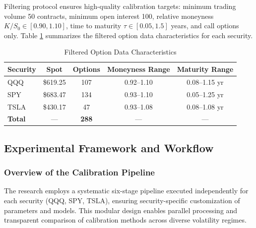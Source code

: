 \documentclass[12pt,a4paper]{article}
\begin{document}
Filtering protocol ensures high-quality calibration targets: minimum trading volume 50 contracts, minimum open interest 100, relative moneyness $K/S_0 \in [0.90, 1.10]$, time to maturity $\tau \in [0.05, 1.5]$ years, and call options only. Table \ref{tab:data_char} summarizes the filtered option data characteristics for each security.

\begin{table}[H]

\centering

\caption{Filtered Option Data Characteristics}

\label{tab:data_char}

\begin{tabular}{lcccc}

\toprule

\textbf{Security} & \textbf{Spot} & \textbf{Options} & \textbf{Moneyness Range} & \textbf{Maturity Range} \\

\midrule

QQQ & \$619.25 & 107 & 0.92--1.10 & 0.08--1.15 yr \\

SPY & \$683.47 & 134 & 0.93--1.10 & 0.05--1.25 yr \\

TSLA & \$430.17 & 47 & 0.93--1.08 & 0.08--1.08 yr \\

\midrule

\textbf{Total} & --- & \textbf{288} & --- & --- \\

\bottomrule

\end{tabular}

\end{table}

\subsection{Experimental Framework and Workflow}

\subsubsection{Overview of the Calibration Pipeline}

The research employs a systematic six-stage pipeline executed independently for each security (QQQ, SPY, TSLA), ensuring security-specific customization of parameters and models. This modular design enables parallel processing and transparent comparison of calibration methods across diverse volatility regimes.
\end{document}
